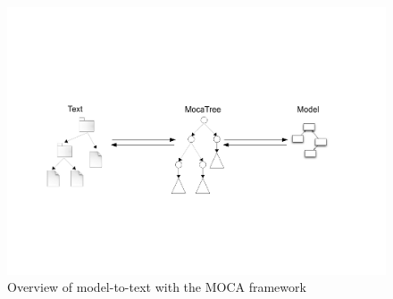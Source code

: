\begin{figure}[htp]
\begin{center}
 \includegraphics[width=\textwidth]{pics/moca/text-to-model}
  \caption{Overview of model-to-text with the MOCA framework}
  \label{moca-overview}
\end{center}
\end{figure} 



 
 
%

%

%
 
